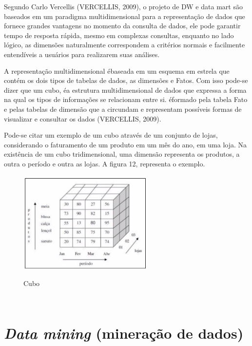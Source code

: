 Segundo Carlo Vercellis (VERCELLIS, 2009), o projeto de DW e data mart s\~{a}o baseados em um paradigma multidimensional para a representa\c{c}\~{a}o de dados que fornece grandes vantagens no momento da consulta de dados, ele pode garantir tempo de resposta r\'{a}pida, mesmo em complexas consultas, enquanto no lado l\'{o}gico, as dimens\~{o}es naturalmente correspondem a crit\'{e}rios normais e facilmente entend\'{i}veis a usu\'{a}rios para realizarem suas an\'{a}lises.

A representa\c{c}\~{a}o multidimensional \'{e}baseada em um esquema em estrela que cont\'{e}m os dois tipos de tabelas de dados, as dimens\~{o}es e Fatos.
Com isso pode-se dizer que um cubo, \'{e}a estrutura multidimensional de dados que expressa a forma na qual os tipos de informa\c{c}\~{o}es se relacionam entre si. \'{e}formado pela tabela Fato e pelas tabelas de dimens\~{a}o que a circundam e representam poss\'{i}veis formas de visualizar e consultar os dados (VERCELLIS, 2009).

Pode-se citar um exemplo de um cubo atrav\'{e}s de um conjunto de lojas, considerando o faturamento de um produto em um mês do ano, em uma loja. Na existência de um cubo tridimensional, uma dimens\~{a}o representa os produtos, a outra o per\'{i}odo e outra as lojas. A figura 12,  representa o exemplo.

\begin{figure}[H]
	\vspace*{0,2cm}
    \centering
    \caption{Cubo}
    \includegraphics[width=0.6\textwidth]{./04-figuras/figura-12}
    \label{fig:ilustfig12}
\end{figure}
\vspace*{-0,9cm}
{\raggedright {}} \\

\section{\textit{Data mining} (minera\c{c}\~{a}o de dados)}

